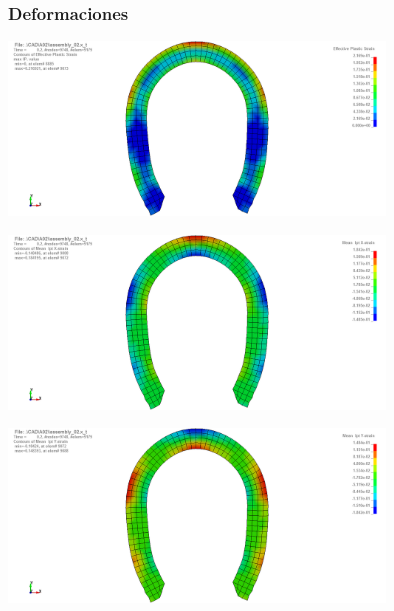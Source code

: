 \subsubsection{Deformaciones}

\begin{center}
\includegraphics[width=0.75\textwidth]{src/ch4/efective_plastic_strain_01.png}
\label{fig:efective_plastic_strain}
\end{center}

\begin{center}
\includegraphics[width=0.75\textwidth]{src/ch4/strain_x_01.png}
\label{fig:efective_plastic_strain}
\end{center}

\begin{center}
\includegraphics[width=0.75\textwidth]{src/ch4/strain_y_01.png}
\label{fig:efective_plastic_strain}
\end{center}





